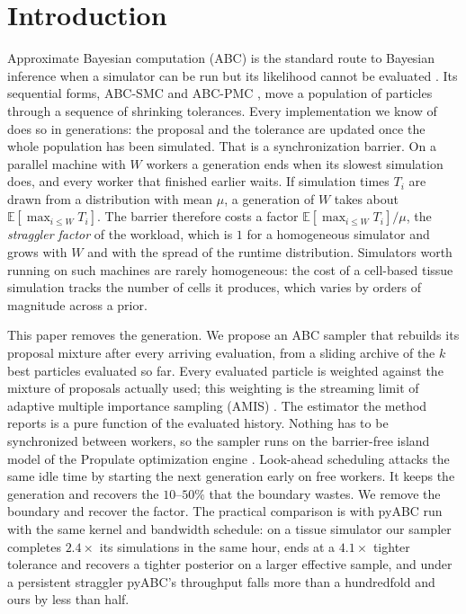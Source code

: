\documentclass[pdflatex,sn-mathphys-num]{sn-jnl}
\theoremstyle{plain}
\theoremstyle{definition}
\begin{document}
\section{Introduction}\label{sec:introduction}

Approximate Bayesian computation (ABC) is the standard route to Bayesian inference when a simulator can be run but its likelihood cannot be evaluated \cite{beaumont2019abc}. Its sequential forms, ABC-SMC and ABC-PMC \cite{sisson2007,toni2009abcsmc,beaumont2009adaptive,delmoral2012adaptive}, move a population of particles through a sequence of shrinking tolerances. Every implementation we know of does so in generations: the proposal and the tolerance are updated once the whole population has been simulated. That is a synchronization barrier. On a parallel machine with $W$ workers a generation ends when its slowest simulation does, and every worker that finished earlier waits. If simulation times $T_i$ are drawn from a distribution with mean $\mu$, a generation of $W$ takes about $\mathbb{E}[\max_{i\le W}T_i]$. The barrier therefore costs a factor $\mathbb{E}[\max_{i\le W}T_i]/\mu$, the \emph{straggler factor} of the workload, which is $1$ for a homogeneous simulator and grows with $W$ and with the spread of the runtime distribution. Simulators worth running on such machines are rarely homogeneous: the cost of a cell-based tissue simulation tracks the number of cells it produces, which varies by orders of magnitude across a prior.

This paper removes the generation. We propose an ABC sampler that rebuilds its proposal mixture after every arriving evaluation, from a sliding archive of the $k$ best particles evaluated so far. Every evaluated particle is weighted against the mixture of proposals actually used; this weighting is the streaming limit of adaptive multiple importance sampling (AMIS) \cite{cornuet2012amis}. The estimator the method reports is a pure function of the evaluated history. Nothing has to be synchronized between workers, so the sampler runs on the barrier-free island model of the Propulate optimization engine \cite{taubert2023propulate}. Look-ahead scheduling \cite{alamoudi2024lookahead} attacks the same idle time by starting the next generation early on free workers. It keeps the generation and recovers the $10$--$50\%$ that the boundary wastes. We remove the boundary and recover the factor. The practical comparison is with pyABC \cite{klinger2018pyabc} run with the same kernel and bandwidth schedule: on a tissue simulator our sampler completes $2.4\times$ its simulations in the same hour, ends at a $4.1\times$ tighter tolerance and recovers a tighter posterior on a larger effective sample, and under a persistent straggler pyABC's throughput falls more than a hundredfold and ours by less than half.
\end{document}

